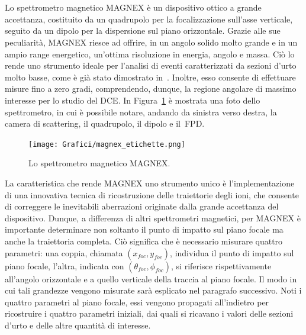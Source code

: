 \section{}

Lo spettrometro magnetico MAGNEX è un dispositivo ottico a grande accettanza, costituito da un quadrupolo per la focalizzazione sull'asse verticale, seguito da un dipolo per la dispersione sul piano orizzontale.
Grazie alle sue peculiarità,  MAGNEX riesce ad offrire, in un angolo solido molto grande e in un ampio range energetico, un'ottima risoluzione in energia, angolo e massa.
Ciò lo rende uno strumento ideale per l'analisi di eventi caratterizzati da sezioni d'urto molto basse, come è già stato dimostrato in~\cite{cappuzzello:epja16,pereira:plb12,oliveira:jpg13}.
Inoltre, esso consente di effettuare misure fino a zero gradi, comprendendo, dunque, la regione angolare di massimo interesse per lo studio del DCE.
In Figura~\ref{fig:magnex} è mostrata una foto dello spettrometro, in cui è possibile notare, andando da sinistra verso destra, la camera di scattering, il quadrupolo, il dipolo e il~FPD.


\begin{figure} [!t]
	\centering
	\texttt{[image: Grafici/magnex\_etichette.png]}
	\caption{Lo spettrometro magnetico MAGNEX.} \label{fig:magnex}
\end{figure}


La caratteristica che rende MAGNEX uno strumento unico è l'implementazione di una innovativa tecnica di ricostruzione delle traiettorie degli ioni, che consente di correggere le inevitabili aberrazioni originate dalla grande accettanza del dispositivo.
Dunque, a differenza di altri spettrometri magnetici, per MAGNEX è importante determinare non soltanto il punto di impatto sul piano focale ma anche la traiettoria completa. Ciò significa che è necessario misurare quattro parametri: una coppia, chiamata $(x_{foc}, y_{foc})$, individua il punto di impatto sul piano focale, l'altra, indicata con $(\theta_{foc}, \phi_{foc})$, si riferisce rispettivamente all'angolo orizzontale e a quello verticale della traccia al piano focale.
Il modo in cui tali grandezze vengono misurate sarà esplicato nel paragrafo successivo.
%
%
%
Noti i quattro parametri al piano focale, essi vengono propagati all'indietro per ricostruire i quattro parametri iniziali, dai quali si ricavano i valori delle sezioni d'urto e delle altre quantità di interesse. 




